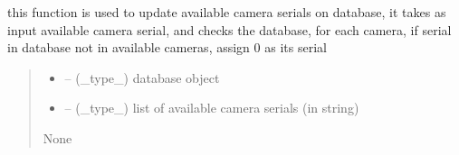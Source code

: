 \documentclass[letterpaper,10pt,english]{sphinxmanual}
\begin{document}
\begin{savenotes}\begin{fulllineitems}
\label{\detokenize{setting/backend/camera_funcs:oxin.backend.camera_funcs.update_available_camera_serials_on_db}}
\pysigstartsignatures
{}
\pysigstopsignatures
\sphinxAtStartPar
this function is used to update available camera serials on database,
it takes as input available camera serial, and checks the database,
for each camera, if serial in database not in available cameras, assign 0 as its serial
\begin{quote}\begin{description}
\begin{itemize}
\item {} 
\sphinxAtStartPar
{} – (\_type\_) database object

\item {} 
\sphinxAtStartPar
{} – (\_type\_) list of available camera serials (in string)

\end{itemize}

\sphinxAtStartPar
None

\end{description}\end{quote}

\end{fulllineitems}\end{savenotes}

\end{document}
